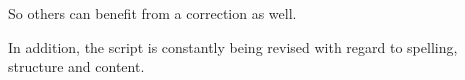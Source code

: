 \documentclass[headtopline=0.08em,headsepline=0.04em, bindingoffset = 5mm]{scrbook}
\numberwithin{equation}{chapter} %
\begin{document}
 So others can benefit from a correction as well.

In addition, the script is constantly being revised with regard to spelling, structure and content.



%
%
%
%
%
%
%

\listoffigures
\end{document}

